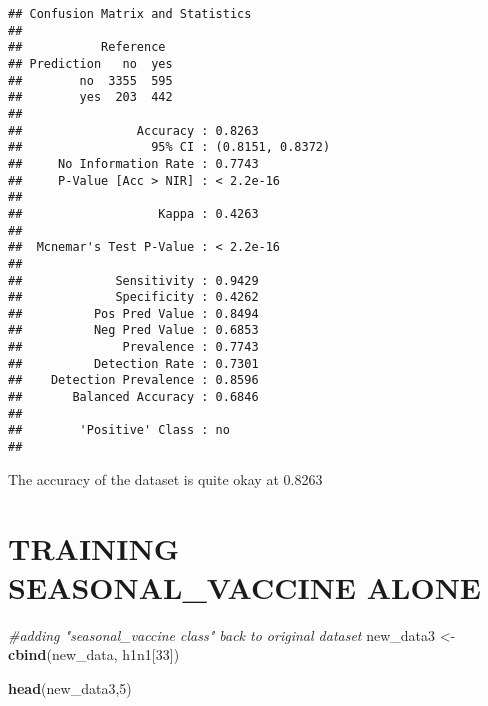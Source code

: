 \documentclass[
]{article}
\newenvironment{Shaded}{\begin{snugshade}}{\end{snugshade}}
\newcommand{\CommentTok}[1]{\textcolor[rgb]{0.56,0.35,0.01}{\textit{#1}}}
\newcommand{\DecValTok}[1]{\textcolor[rgb]{0.00,0.00,0.81}{#1}}
\newcommand{\FunctionTok}[1]{\textcolor[rgb]{0.13,0.29,0.53}{\textbf{#1}}}
\newcommand{\NormalTok}[1]{#1}
\newcommand{\OtherTok}[1]{\textcolor[rgb]{0.56,0.35,0.01}{#1}}
\begin{document}
\begin{verbatim}
## Confusion Matrix and Statistics
## 
##           Reference
## Prediction   no  yes
##        no  3355  595
##        yes  203  442
##                                           
##                Accuracy : 0.8263          
##                  95% CI : (0.8151, 0.8372)
##     No Information Rate : 0.7743          
##     P-Value [Acc > NIR] : < 2.2e-16       
##                                           
##                   Kappa : 0.4263          
##                                           
##  Mcnemar's Test P-Value : < 2.2e-16       
##                                           
##             Sensitivity : 0.9429          
##             Specificity : 0.4262          
##          Pos Pred Value : 0.8494          
##          Neg Pred Value : 0.6853          
##              Prevalence : 0.7743          
##          Detection Rate : 0.7301          
##    Detection Prevalence : 0.8596          
##       Balanced Accuracy : 0.6846          
##                                           
##        'Positive' Class : no              
## 
\end{verbatim}

The accuracy of the dataset is quite okay at 0.8263

\section{TRAINING SEASONAL\_VACCINE
ALONE}\label{training-seasonal_vaccine-alone}

\begin{Shaded}
\begin{Highlighting}[]
\CommentTok{\#adding "seasonal\_vaccine class" back to original dataset}
\NormalTok{new\_data3 }\OtherTok{\textless{}{-}} \FunctionTok{cbind}\NormalTok{(new\_data, h1n1[}\DecValTok{33}\NormalTok{])}
\end{Highlighting}
\end{Shaded}

\begin{Shaded}
\begin{Highlighting}[]
\FunctionTok{head}\NormalTok{(new\_data3,}\DecValTok{5}\NormalTok{)}
\end{Highlighting}
\end{Shaded}
\end{document}
